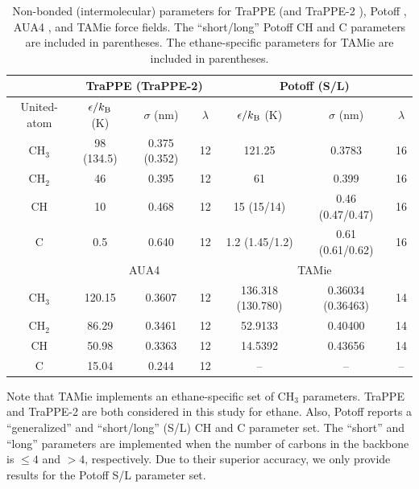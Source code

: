 \documentclass[preprint,review,12pt]{elsarticle}
\begin{document}
	\begin{table}[h!]
		\caption{Non-bonded (intermolecular) parameters for TraPPE \cite{TraPPE,Martin1999} (and TraPPE-2 \cite{TraPPEUA2}), Potoff \cite{Mie,Potoff_branched}, AUA4 \cite{AUA4,Nieto2008}, and TAMie \cite{TAMie,Weidler2016} force fields. The ``short/long'' Potoff CH and C parameters are included in parentheses. The ethane-specific parameters for TAMie are included in parentheses.} \label{tab:nonbonded params}
		\begin{center}
			\begin{tabular}{|c|c|c|c|c|c|c|}
				\hline
				\multicolumn{1}{|c}{} & \multicolumn{3}{|c}{TraPPE  (TraPPE-2)} & \multicolumn{3}{|c|}{Potoff (S/L)}  \\ \hline
				United-atom & $\epsilon/k_{\rm B}$ (K) & $\sigma$ (nm) & $\lambda$ & $\epsilon/k_{\rm B}$ (K) & $\sigma$ (nm) & $\lambda$ \\ \hline
				CH$_3$ & 98 (134.5)  & 0.375 (0.352) & 12 & 121.25 & 0.3783 & 16  \\ 
				CH$_2$ & 46 & 0.395 & 12 & 61 & 0.399 & 16 \\ 
				CH & 10 & 0.468 & 12 & 15 (15/14) & 0.46 (0.47/0.47) & 16\\
				C & 0.5 & 0.640 & 12 & 1.2 (1.45/1.2) & 0.61 (0.61/0.62) & 16\\
				\hline
				\multicolumn{1}{|c}{} & \multicolumn{3}{|c}{AUA4} & \multicolumn{3}{|c|}{TAMie} \\ \hline
				CH$_3$ & 120.15  & 0.3607 & 12 & 136.318 (130.780) & 0.36034 (0.36463) & 14 \\ 
				CH$_2$ & 86.29 & 0.3461 & 12 & 52.9133 & 0.40400 & 14 \\ 
				CH & 50.98 & 0.3363 & 12 & 14.5392 & 0.43656 & 14\\
				C & 15.04 & 0.244 & 12 & -- & -- & --\\
				\hline
			\end{tabular}
		\end{center} 
	\end{table}

    Note that TAMie implements an ethane-specific set of CH$_3$ parameters. TraPPE and TraPPE-2 are both considered in this study for ethane. Also, Potoff reports a ``generalized'' and ``short/long'' (S/L) CH and C parameter set. The ``short'' and ``long'' parameters are implemented when the number of carbons in the backbone is $\le 4$ and $> 4$, respectively. Due to their superior accuracy, we only provide results for the Potoff S/L parameter set.
    
\end{document}
